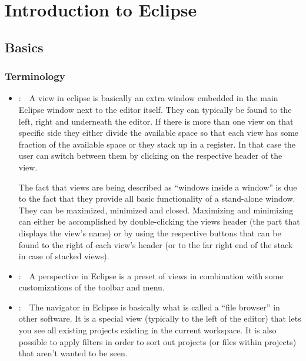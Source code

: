 \documentclass[twoside=false]{scrbook}
\newcommand{\eclipse}{Eclipse\xspace}
\begin{document}
	
	
	\chapter{Introduction to \eclipse}
	\label{ch:IntroductionToTheEclipseUI}
	
	\section{Basics}
	
	\subsection{Terminology}
	
	\begin{itemize}
		\item {}:~~A view in eclipse is basically an extra window embedded in the main \eclipse window next to the editor itself. They can typically be found to the left, right and underneath the editor. If there is more than one view on that specific side they either divide the available space so that each view has some fraction of the available space or they stack up in a register. In that case the user can switch between them by clicking on the respective header of the view.
		
		The fact that views are being described as “windows inside a window” is due to the fact that they provide all basic functionality of a stand-alone window. They can be maximized, minimized and closed. Maximizing and minimizing can either be accomplished by double-clicking the views header (the part that displays the view's name) or by using the respective buttons that can be found to the right of each view's header (or to the far right end of the stack in case of stacked views).
		
		\item {}:~~A perspective in \eclipse is a preset of views in combination with some customizations of the toolbar and menu.
		
		\item {}:~~The navigator in \eclipse is basically what is called a “file browser” in other software. It is a special view (typically to the left of the editor) that lets you see all existing projects existing in the current workspace. It is also possible to apply filters in order to sort out projects (or files within projects) that aren't wanted to be seen. 
		

\end{itemize}
\end{document}
